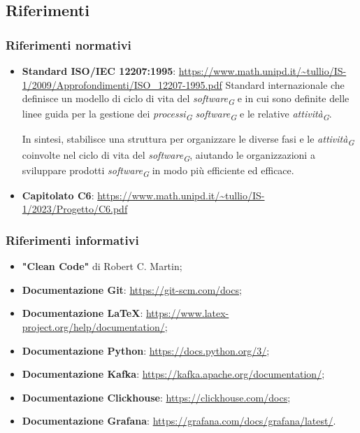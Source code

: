 \subsection{Riferimenti}
\subsubsection{Riferimenti normativi}
\begin{itemize}
    \item \textbf{Standard ISO/IEC 12207:1995}: \url{https://www.math.unipd.it/~tullio/IS-1/2009/Approfondimenti/ISO_12207-1995.pdf}
    Standard internazionale che definisce un modello di ciclo di vita del \textit{software}\textsubscript{\textit{G}} e in cui sono definite delle linee guida per la gestione dei \textit{processi}\textsubscript{\textit{G}} \textit{software}\textsubscript{\textit{G}} e le relative \textit{attività}\textsubscript{\textit{G}}.
    
    In sintesi, stabilisce una struttura per organizzare le diverse fasi e le \textit{attività}\textsubscript{\textit{G}} coinvolte nel ciclo di vita del \textit{software}\textsubscript{\textit{G}}, aiutando le organizzazioni a sviluppare prodotti \textit{software}\textsubscript{\textit{G}} in modo più efficiente ed efficace.

    \item \textbf{Capitolato C6}: \url{https://www.math.unipd.it/~tullio/IS-1/2023/Progetto/C6.pdf}

\end{itemize}

\subsubsection{Riferimenti informativi}
\begin{itemize}
    \item \textbf{"Clean Code"} di Robert C. Martin;
    \item \textbf{Documentazione Git}: \url{https://git-scm.com/docs};
    \item \textbf{Documentazione \LaTeX}: \url{https://www.latex-project.org/help/documentation/};
    \item \textbf{Documentazione Python}: \url{https://docs.python.org/3/};
    \item \textbf{Documentazione Kafka}: \url{https://kafka.apache.org/documentation/};
    \item \textbf{Documentazione Clickhouse}: \url{https://clickhouse.com/docs};
    \item \textbf{Documentazione Grafana}: \url{https://grafana.com/docs/grafana/latest/}.
\end{itemize}
